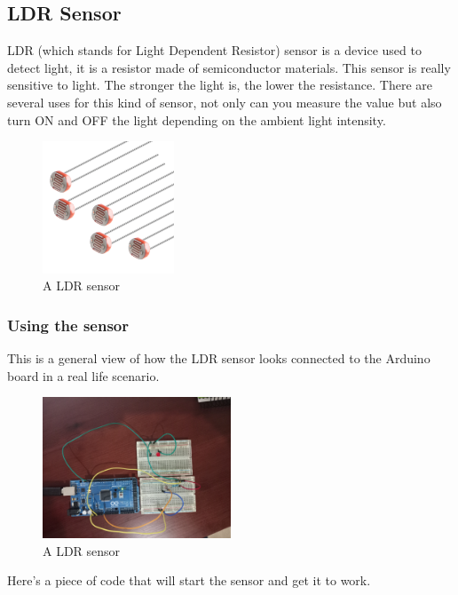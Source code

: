 \subsection{LDR Sensor}
LDR (which stands for Light Dependent Resistor) sensor is a device used to detect light, it is a resistor made of semiconductor materials. This sensor is really sensitive to light. The stronger the light is, the lower the resistance. There are several uses for this kind of sensor, not only can you measure the value but also turn ON and OFF the light depending on the ambient light intensity.

\begin{figure}[htp]
    \centering
    \includegraphics[width=0.35\textwidth]{fig/ldr.jpg}
    \caption{A LDR sensor}
    \label{fig:ldr}
\end{figure}

\subsubsection{Using the sensor}

This is a general view of how the LDR sensor looks connected to the Arduino board in a real life scenario.

\begin{figure}[H]
    \centering
    \includegraphics[width=0.5\textwidth]{fig/ldr-circuit.jpg}
    \caption{A LDR sensor}
    \label{fig:ldr}
\end{figure}

Here's a piece of code that will start the sensor and get it to work.


